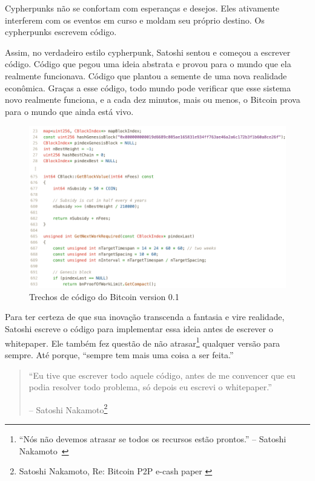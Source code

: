 Cypherpunks não se confortam com esperanças e desejos. 
Eles ativamente interferem com os eventos em curso e moldam seu próprio destino. 
Os cypherpunks escrevem código.

Assim, no verdadeiro estilo cypherpunk, Satoshi sentou e começou a escrever código. 
Código que pegou uma ideia abstrata e provou para o mundo que ela realmente funcionava. 
Código que plantou a semente de uma nova realidade econômica.
Graças a esse código, todo mundo pode verificar que esse sistema novo realmente funciona, e 
a cada dez minutos, mais ou menos, o Bitcoin prova para o mundo que ainda está vivo.

\begin{figure}
  \includegraphics{assets/images/bitcoin-code-white.png}
  \caption{Trechos de código do Bitcoin version 0.1}
  \label{fig:bitcoin-code-white}
\end{figure}

Para ter certeza de que sua inovação transcenda a fantasia e vire realidade, Satoshi 
escreve o código para implementar essa ideia antes de escrever o whitepaper. 
Ele também fez questão de não atrasar\footnote{\enquote{Nós não devemos atrasar 
		se todos os recursos estão prontos.} 
	-- Satoshi Nakamoto~\cite{satoshi-delay}} qualquer versão para sempre.
	Até porque, \enquote{sempre tem mais uma coisa a ser feita.}

\begin{quotation}\begin{samepage}
\enquote{Eu tive que escrever todo aquele código, antes de me convencer que eu podia resolver todo problema, só depois eu escrevi o whitepaper.}
\begin{flushright} -- Satoshi Nakamoto\footnote{Satoshi Nakamoto, Re: Bitcoin P2P e-cash paper \cite{satoshi-mail-code-first}}
\end{flushright}\end{samepage}\end{quotation}

